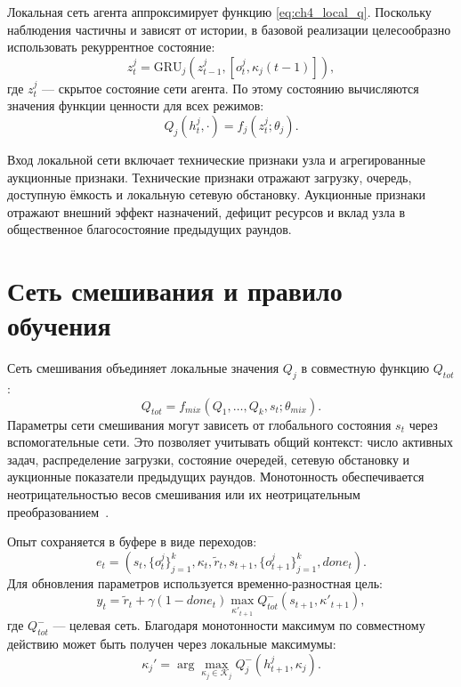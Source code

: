 Локальная сеть агента аппроксимирует функцию \eqref{eq:ch4_local_q}. Поскольку наблюдения частичны и зависят от истории, в базовой реализации целесообразно использовать рекуррентное состояние:
\begin{equation}
    z^j_t =
    \mathrm{GRU}_j
    \left(
        z^j_{t-1},
        [o^j_t,\kappa_j(t-1)]
    \right),
    \label{eq:ch4_gru_state}
\end{equation}
где $z^j_t$ --- скрытое состояние сети агента. По этому состоянию вычисляются значения функции ценности для всех режимов:
\begin{equation}
    Q_j(h^j_t,\cdot)
    =
    f_j(z^j_t;\theta_j).
    \label{eq:ch4_q_values}
\end{equation}

Вход локальной сети включает технические признаки узла и агрегированные аукционные признаки. Технические признаки отражают загрузку, очередь, доступную ёмкость и локальную сетевую обстановку. Аукционные признаки отражают внешний эффект назначений, дефицит ресурсов и вклад узла в общественное благосостояние предыдущих раундов.

\section{Сеть смешивания и правило обучения}

Сеть смешивания объединяет локальные значения $Q_j$ в совместную функцию $Q_{tot}$:
\begin{equation}
    Q_{tot}
    =
    f_{mix}
    \left(
        Q_1,\ldots,Q_k,s_t;\theta_{mix}
    \right).
    \label{eq:ch4_mixing_network}
\end{equation}
Параметры сети смешивания могут зависеть от глобального состояния $s_t$ через вспомогательные сети. Это позволяет учитывать общий контекст: число активных задач, распределение загрузки, состояние очередей, сетевую обстановку и аукционные показатели предыдущих раундов. Монотонность обеспечивается неотрицательностью весов смешивания или их неотрицательным преобразованием~\cite{Rashid2018QMIX}.

Опыт сохраняется в буфере в виде переходов:
\begin{equation}
    e_t =
    \left(
        s_t,
        \{o^j_t\}_{j=1}^{k},
        \kappa_t,
        \tilde{r}_t,
        s_{t+1},
        \{o^j_{t+1}\}_{j=1}^{k},
        done_t
    \right).
    \label{eq:ch4_transition}
\end{equation}
Для обновления параметров используется временно-разностная цель:
\begin{equation}
    y_t =
    \tilde{r}_t
    +
    \gamma(1-done_t)
    \max_{\kappa'_{t+1}}
    Q^{-}_{tot}
    (s_{t+1},\kappa'_{t+1}),
    \label{eq:ch4_target}
\end{equation}
где $Q^{-}_{tot}$ --- целевая сеть. Благодаря монотонности максимум по совместному действию может быть получен через локальные максимумы:
\begin{equation}
    \kappa_j' =
    \arg\max_{\kappa_j\in\mathcal{K}_j}
    Q^{-}_j(h^j_{t+1},\kappa_j).
    \label{eq:ch4_next_action}
\end{equation}

